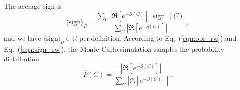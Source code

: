 The average sign is 
\begin{equation}\label{eqn:sign_rw}
	 \langle \text{sign} \rangle_{\overline{P}} =    \frac { \sum_{C}  \left|  \Re \left[ e^{-S(C)} \right]   \right|   \text{ sign }(C) }  {  \sum_{C}   \left| \Re \left[ e^{-S(C)} \right] \right|  } \;,
\end{equation}
and we have  $\langle \text{sign} \rangle_{\overline{P}} \in \mathbb{R}$ per definition.
According to Eq.~(\ref{eqn:obs_rw}) and Eq.~(\ref{eqn:sign_rw}), the Monte Carlo simulation samples the probability distribution 
\begin{equation}  
	 \overline{P}(C) = \frac{ \left|  \Re \left[ e^{-S(C)} \right] \right| }{\sum_C \left|  \Re \left[ e^{-S(C)} \right]  \right| }\;.
\end{equation}



 
